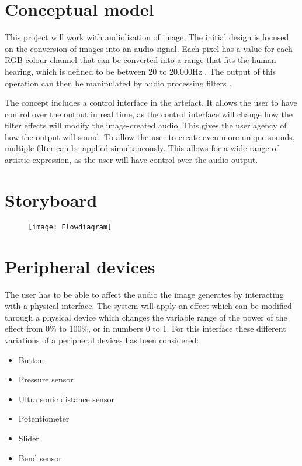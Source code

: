\section{Conceptual model}
This project will work with audiolisation of image. The initial design is focused on the conversion of images into an audio signal. Each pixel has a value for each RGB colour channel that can be converted into a range that fits the human hearing, which is defined to be between 20 to 20.000Hz . The output of this operation can then be manipulated by audio processing filters .

The concept includes a control interface in the artefact. It allows the user to have control over the output in real time, as the control interface will change how the filter effects will modify the image-created audio. This gives the user agency of how the output will sound. To allow the user to create even more unique sounds, multiple filter can be applied simultaneously. This allows for a wide range of artistic expression, as the user will have control over the audio output.

\section{Storyboard}
\begin{figure}[!h] 
\centering
\texttt{[image: Flowdiagram]}
\caption{\label{fig:Flowdiagram} }
\end{figure}

\section{Peripheral devices}
The user has to be able to affect the audio the image generates by interacting with a physical interface. The system will apply an effect which can be modified through a physical device which changes the variable range of the power of the effect from 0\% to 100\%, or in numbers 0 to 1. For this interface these different variations of a peripheral devices has been considered: 

\begin{itemize}
\item Button
\item Pressure sensor
\item Ultra sonic distance sensor
\item Potentiometer
\item Slider
\item Bend sensor
\end{itemize}

